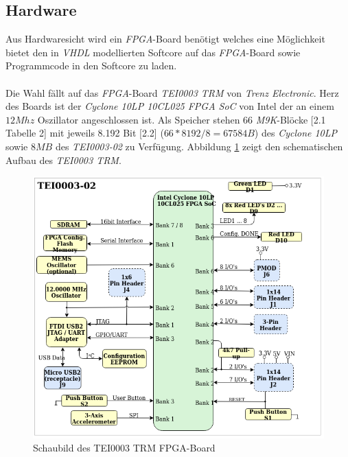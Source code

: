         \subsection{Hardware}\label{lab:hardware}
            Aus Hardwaresicht wird ein \textit{FPGA}-Board benötigt welches eine Möglichkeit bietet
            den in \textit{VHDL} modellierten Softcore auf das \textit{FPGA}-Board sowie Programmcode
            in den Softcore zu laden.
            \\\\
            Die Wahl fällt auf das \textit{FPGA}-Board \textit{TEI0003 TRM} von \textit{Trenz Electronic}.
            Herz des Boards ist der \textit{Cyclone 10LP 10CL025 FPGA SoC} von Intel der an einem $12 Mhz$
            Oszillator angeschlossen ist. 
            Als Speicher stehen 66 \textit{M9K}-Blöcke \cite{intel-cyc10lp-io-datasheet}[2.1 Tabelle 2] mit jeweils 8.192 Bit
            \cite{intel-cyc10lp-io-datasheet}[2.2] ($66*8192/8 = 67584B$) des \textit{Cyclone 10LP} sowie $8 MB$ des \textit{TEI0003-02} zu Verfügung.
            Abbildung \ref{fig:fpga_schematic} zeigt den schematischen Aufbau des \textit{TEI0003 TRM}.
            \begin{figure}[H]
                \centering
                \includegraphics[scale=0.5]{img/fpga_board_schematic.png}
                \caption[Schaubild des TEI0003 TRM FPGA-Board]{Schaubild des TEI0003 TRM FPGA-Board \cite{terz} }
                \label{fig:fpga_schematic}
            \end{figure}

